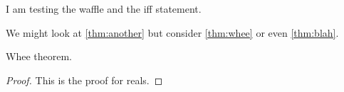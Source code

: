 \documentclass{ximera}
\begin{document}
I am testing the waffle and the iff statement.


\begin{theorem}
  \label{thm:blah}
\end{theorem}

We might look at \ref{thm:another} but consider \ref{thm:whee} or even \ref{thm:blah}.

\begin{theorem}
  \label{thm:whee}  Whee theorem.
\end{theorem}
\begin{proof}
This is the proof for reals.
\end{proof}
\end{document}
